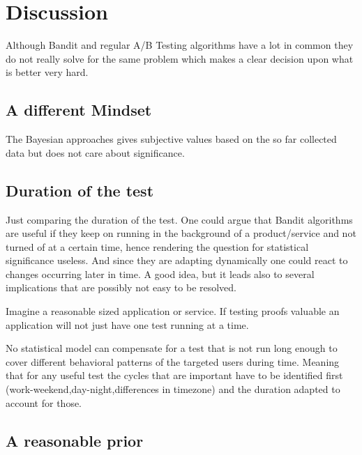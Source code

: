 \documentclass[main.tex]{subfiles}
\begin{document}
\chapter{Discussion}
Although Bandit and regular A/B Testing algorithms have a lot in common they do not really solve for the same problem which makes a clear decision upon what is better very hard.
\section{A different Mindset}
The Bayesian approaches gives subjective values based on the so far collected data but does not care about significance.

\section{Duration of the test}
Just comparing the duration of the test. One could argue that Bandit algorithms are useful if they keep on running in the background of a product/service and not turned of at a certain time, hence rendering the question for statistical significance useless. And since they are adapting dynamically one could react to changes occurring later in time. A good idea, but it leads also to several implications that are possibly not easy to be resolved. 

Imagine a reasonable sized application or service. If testing proofs valuable an application will not just have one test running at a time. 

No statistical model can compensate for a test that is not run long enough to cover different behavioral patterns of the targeted users during time. Meaning that for any useful test the cycles that are important have to be identified first (work-weekend,day-night,differences in timezone) and the duration adapted to account for those.

\section{A reasonable prior}
\end{document}
